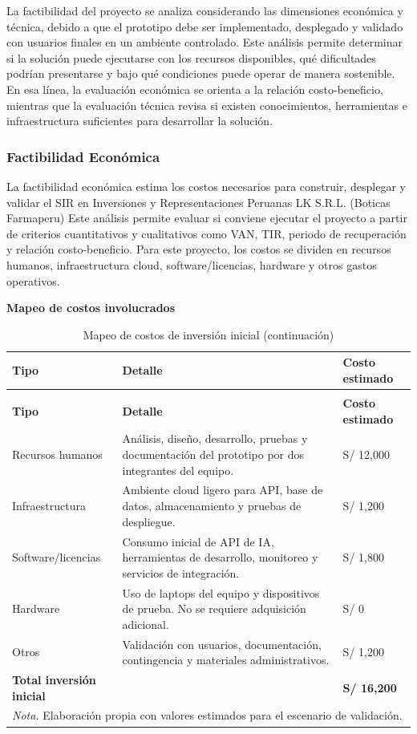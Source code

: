 \documentclass[12pt,a4paper,oneside]{report}
\begin{document}
La factibilidad del proyecto se analiza considerando las dimensiones económica y técnica, debido a que el prototipo debe ser implementado, desplegado y validado con usuarios finales en un ambiente controlado. Este análisis permite determinar si la solución puede ejecutarse con los recursos disponibles, qué dificultades podrían presentarse y bajo qué condiciones puede operar de manera sostenible. En esa línea, la evaluación económica se orienta a la relación costo-beneficio, mientras que la evaluación técnica revisa si existen conocimientos, herramientas e infraestructura suficientes para desarrollar la solución.

\subsubsection{Factibilidad Económica}\label{subsubsec:factibilidad-economica}

La factibilidad económica estima los costos necesarios para construir, desplegar y validar el SIR en Inversiones y Representaciones Peruanas LK S.R.L. (Boticas Farmaperu) Este análisis permite evaluar si conviene ejecutar el proyecto a partir de criterios cuantitativos y cualitativos como VAN, TIR, periodo de recuperación y relación costo-beneficio. Para este proyecto, los costos se dividen en recursos humanos, infraestructura cloud, software/licencias, hardware y otros gastos operativos.

\textbf{Mapeo de costos involucrados}

\begin{longtable}{@{}p{}p{}p{}@{}}
\caption{Mapeo de costos de inversión inicial}\label{tab:mapeo-costos}\\
\toprule
\textbf{Tipo} & \textbf{Detalle} & \textbf{Costo estimado} \\
\midrule
\endfirsthead
\caption[]{Mapeo de costos de inversión inicial (continuación)}\\
\toprule
\textbf{Tipo} & \textbf{Detalle} & \textbf{Costo estimado} \\
\midrule
\endhead
Recursos humanos & Análisis, diseño, desarrollo, pruebas y documentación del prototipo por dos integrantes del equipo. & S/ 12,000 \\
Infraestructura & Ambiente cloud ligero para API, base de datos, almacenamiento y pruebas de despliegue. & S/ 1,200 \\
Software/licencias & Consumo inicial de API de IA, herramientas de desarrollo, monitoreo y servicios de integración. & S/ 1,800 \\
Hardware & Uso de laptops del equipo y dispositivos de prueba. No se requiere adquisición adicional. & S/ 0 \\
Otros & Validación con usuarios, documentación, contingencia y materiales administrativos. & S/ 1,200 \\
\textbf{Total inversión inicial} & & \textbf{S/ 16,200} \\
\bottomrule
\multicolumn{3}{p{0.94\textwidth}}{\normalsize \textit{Nota.} Elaboración propia con valores estimados para el escenario de validación.}\\
\end{longtable}
\end{document}
